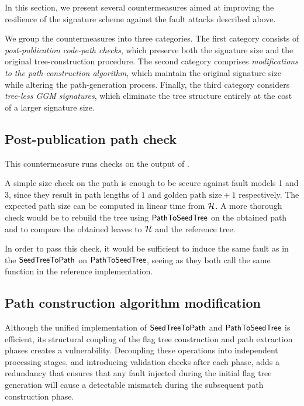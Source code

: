 In this section, we present several countermeasures aimed at 
improving the resilience of the signature scheme against the 
fault attacks described above.

We group the countermeasures into three categories. The 
first category consists of \emph{post-publication code-path 
checks}, which preserve both the signature size and the 
original tree-construction procedure. The second category 
comprises \emph{modifications to the path-construction 
algorithm}, which maintain the original signature size while 
altering the path-generation process. Finally, the third 
category considers \emph{tree-less GGM signatures}, which 
eliminate the tree structure entirely at the cost of a 
larger signature size.


\subsection{Post-publication path check}

This countermeasure runs checks on the output of \SeedTreeToPath.

A simple size check on the path is enough to be secure against fault models 1 and 3, 
since they result in path lengths of $1$ and $\text{golden path size}+1$ respectively.
The expected path size can be computed in linear time from $\mathcal{H}$. 
A more thorough check would be to rebuild the tree using $\mathsf{PathToSeedTree}$ 
on the obtained path and to compare the obtained leaves to $\mathcal{H}$ and the reference tree.

\begin{remark}
    In order to pass this check, it would be sufficient to induce 
    the same fault as in the $\mathsf{SeedTreeToPath}$ on $\mathsf{PathToSeedTree}$, seeing as they both 
    call the same function in the reference implementation.
\end{remark}



\subsection{Path construction algorithm modification}

Although the unified implementation of $\mathsf{SeedTreeToPath}$ and $\mathsf{PathToSeedTree}$ is efficient, 
its structural coupling of the flag tree construction and path extraction phases creates a vulnerability.
Decoupling these operations into independent processing stages, and introducing validation checks after each phase, 
adds a redundancy that ensures that any fault injected during the initial flag tree 
generation will cause a detectable mismatch during the subsequent path construction phase.

